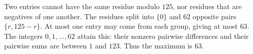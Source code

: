 Two entries cannot have the same residue modulo $125$, nor residues that are negatives of one another. The residues split into $\{0\}$ and $62$ opposite pairs $\{r,125-r\}$. At most one entry may come from each group, giving at most $63$. The integers $0,1,\ldots,62$ attain this: their nonzero pairwise differences and their pairwise sums are between $1$ and $123$. Thus the maximum is $\boxed{63}$.
